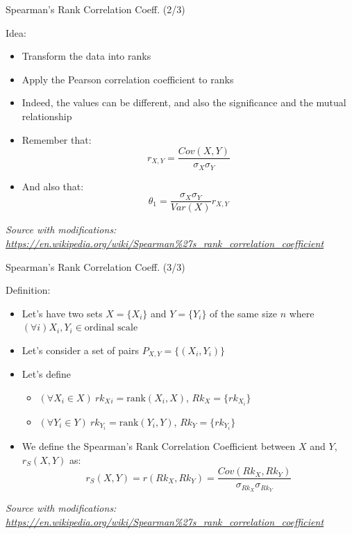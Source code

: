 \documentclass{beamer}
\begin{document}
\begin{frame}
{\centerline{Spearman's Rank Correlation Coeff. (2/3)}}
Idea:
\begin{itemize}
   \item Transform the data into ranks
   \item Apply the Pearson correlation coefficient to ranks
   \item Indeed, the values can be different, and also the significance and the mutual relationship
   \item Remember that:
   $$r_{X,Y} = \frac{Cov(X,Y)}{\sigma_X\sigma_Y}$$
   \item And also that:
   $$ \theta_1  = \frac{\sigma_X\sigma_Y}{Var(X)} r_{X,Y}   $$
\end{itemize}

\textit{\tiny
\vspace{-\baselineskip}
Source with modifications: \url{https://en.wikipedia.org/wiki/Spearman\%27s_rank_correlation_coefficient}}

\end{frame}

\begin{frame}
{\centerline{Spearman's Rank Correlation Coeff. (3/3)}}
Definition:
\begin{itemize}
   \item Let's have two sets $X = \{X_i\}$ and $Y= \{Y_i\}$ of the same size $n$ where $(\forall i) X_i,Y_i \in \text{ordinal scale}$
   \item Let's consider a set of pairs $P_{X,Y} = \{(X_i,Y_i)\}$ 
   \item Let's define 
   \begin{itemize}
   \item $(\forall X_i \in X) ~ rk{_X{_i}} = \text{rank}(X_i,X)$, $Rk_X = \{ rk_{X{_i}} \} $ 
   \item $(\forall Y_i \in Y) ~ rk_{Y{_i}} = \text{rank}(Y_i,Y)$, $Rk_Y = \{ rk_{Y{_i}} \} $ 
\end{itemize}
    \item We define the Spearman's Rank Correlation Coefficient between $X$ and $Y$, $r_S(X,Y)$ as:
    $$r_S(X,Y) = r(Rk_X, Rk_Y) = \frac{Cov(Rk_X,Rk_Y)}{\sigma_{Rk_X}\sigma_{Rk_Y}}$$
\end{itemize}

\textit{\tiny
\vspace{-\baselineskip}
Source with modifications: \url{https://en.wikipedia.org/wiki/Spearman\%27s_rank_correlation_coefficient}}

\end{frame}
\end{document}
